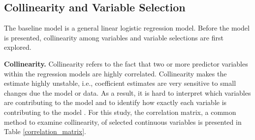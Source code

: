 \documentclass[12pt,english]{report}
\begin{document}

\subsection{Collinearity and Variable Selection}
The baseline model is a general linear logistic regression model.  Before the model is presented, collinearity among variables and variable selections are  first explored.

\vspace{0.15in}
\noindent \textbf{Collinearity. } Collinearity refers to the fact that two or more predictor variables within the regression models are highly correlated.  Collinearity makes the estimate highly unstable, i.e., coefficient estimates are very sensitive to small changes due  the model or data. As a result,  it is hard to interpret which variables are contributing to the model and to identify how exactly each variable is contributing to the model \citep{belsley2005regression, Midi2010}. For this study, the correlation matrix, a common method to examine collinearity,  of selected continuous variables is presented in Table \ref{correlation_matrix}. 
\end{document}
